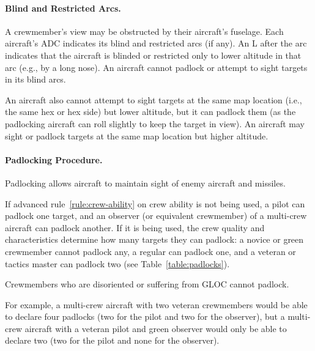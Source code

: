 {\paragraph{Blind and Restricted Arcs.} A crewmember’s view may be obstructed by their aircraft’s fuselage. Each aircraft’s ADC indicates its blind and restricted  arcs (if any). An L after the arc indicates that the aircraft is blinded or restricted only to lower altitude in that arc (e.g., by a long nose). An aircraft cannot padlock or attempt to sight targets in its blind arcs. 


An aircraft also cannot attempt to sight targets at the same map location (i.e., the same hex or hex side) but lower altitude, but it can padlock them (as the padlocking aircraft can roll slightly to keep the target in view). An aircraft may sight or padlock targets at the same map location but higher altitude.

\paragraph{Padlocking Procedure.}

Padlocking allows aircraft to maintain sight of enemy aircraft and missiles.

If advanced rule~\ref{rule:crew-ability} on crew ability is not being used, a pilot can padlock one target, and an observer (or equivalent crewmember) of a multi-crew aircraft can padlock another. If it is being used, the crew quality and characteristics determine how many targets they can padlock: a novice or green crewmember cannot padlock any, a regular can padlock one, and a veteran or tactics master can padlock two (see Table~\ref{table:padlocks}). 

Crewmembers who are disoriented or suffering from GLOC cannot padlock.

For example, a multi-crew aircraft with two veteran crewmembers would be able to declare four padlocks (two for the pilot and two for the observer), but a multi-crew aircraft with a veteran pilot and green observer would only be able to declare two (two for the pilot and none for the observer).

}
